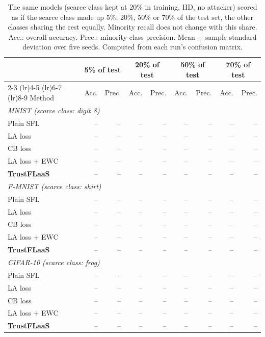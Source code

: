 \begin{table}[t]
\centering
\scriptsize
\setlength{\tabcolsep}{3pt}
\caption{The same models (scarce class kept at 20\% in training, IID, no attacker) scored as if the scarce class made up 5\%, 20\%, 50\% or 70\% of the test set, the other classes sharing the rest equally. Minority recall does not change with this share. Acc.: overall accuracy. Prec.: minority-class precision. Mean $\pm$ sample standard deviation over five seeds. Computed from each run's confusion matrix.}
\label{tab:priorshift}
\begin{tabular}{lrrrrrrrr}
\toprule
 & \multicolumn{2}{c}{5\% of test} & \multicolumn{2}{c}{20\% of test} & \multicolumn{2}{c}{50\% of test} & \multicolumn{2}{c}{70\% of test} \\
\cmidrule(lr){2-3} \cmidrule(lr){4-5} \cmidrule(lr){6-7} \cmidrule(lr){8-9}
Method & Acc. & Prec. & Acc. & Prec. & Acc. & Prec. & Acc. & Prec. \\
\midrule
\multicolumn{9}{l}{\textit{MNIST (scarce class: digit 8)}} \\
Plain SFL & -- & -- & -- & -- & -- & -- & -- & -- \\
LA loss & -- & -- & -- & -- & -- & -- & -- & -- \\
CB loss & -- & -- & -- & -- & -- & -- & -- & -- \\
LA loss + EWC & -- & -- & -- & -- & -- & -- & -- & -- \\
\textbf{TrustFLaaS} & -- & -- & -- & -- & -- & -- & -- & -- \\
\midrule
\multicolumn{9}{l}{\textit{F-MNIST (scarce class: shirt)}} \\
Plain SFL & -- & -- & -- & -- & -- & -- & -- & -- \\
LA loss & -- & -- & -- & -- & -- & -- & -- & -- \\
CB loss & -- & -- & -- & -- & -- & -- & -- & -- \\
LA loss + EWC & -- & -- & -- & -- & -- & -- & -- & -- \\
\textbf{TrustFLaaS} & -- & -- & -- & -- & -- & -- & -- & -- \\
\midrule
\multicolumn{9}{l}{\textit{CIFAR-10 (scarce class: frog)}} \\
Plain SFL & -- & -- & -- & -- & -- & -- & -- & -- \\
LA loss & -- & -- & -- & -- & -- & -- & -- & -- \\
CB loss & -- & -- & -- & -- & -- & -- & -- & -- \\
LA loss + EWC & -- & -- & -- & -- & -- & -- & -- & -- \\
\textbf{TrustFLaaS} & -- & -- & -- & -- & -- & -- & -- & -- \\
\bottomrule
\end{tabular}
\end{table}
